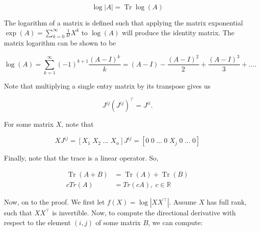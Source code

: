 \documentclass{article}
\theoremstyle{definition}
\DeclareMathOperator{\Tr}{Tr}
\begin{document}
\begin{equation}
    \label{eqn:Jacobi}
    \log |A| = \Tr \log (A)
\end{equation}

The logarithm of a matrix is defined such that applying the matrix exponential $\exp(A) = \sum_{k=0}^{\infty} \frac{1}{k!} X^k$ to $\log(A)$ will produce the identity matrix. The matrix logarithm can be shown to be

\begin{equation}
    \label{eqn:matrixLog}
    \log(A) = \sum_{k=1}^{\infty} (-1)^{k+1} \frac{(A-I)^k}{k} = (A - I) - \frac{(A-I)^2}{2} + \frac{(A-I)^3}{3} + \dots.
\end{equation}

Note that multiplying a single entry matrix by its transpose gives us

\[
J^{ij} (J^{ij})^\top = J^{ii}.
\]

For some matrix $X$, note that

\[
XJ^{ij} = [X_1 \; X_2 \; \dots \; X_n] J^{ij} = [0 \; 0 \;  \dots \; 0 \; X_j \; 0 \; \dots \;  0]
\]

Finally, note that the trace is a linear operator. So,

\[
\begin{split}
    \Tr(A + B) & = \Tr(A) + \Tr(B) \\ 
    cTr(A) &= Tr(cA), \; c \in \mathbb{R}
\end{split}
\]

Now, on to the proof. We first let $f(X) = \log |XX^\top|$. Assume $X$ has full rank, such that $XX^\top$ is invertible. Now, to compute the directional derivative with respect to the element $(i,j)$ of some matrix $B$, we can compute:
\end{document}
